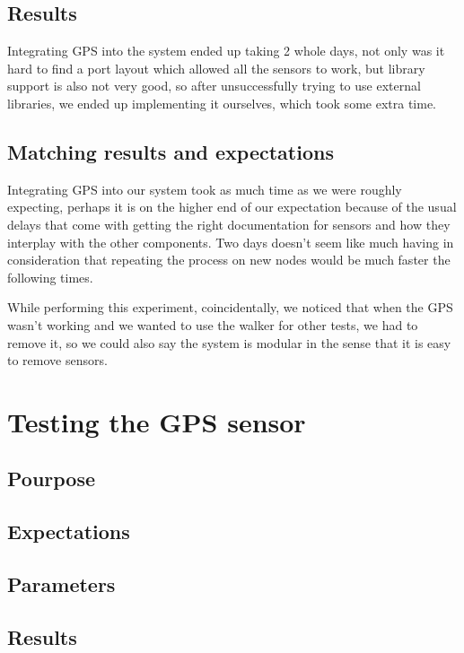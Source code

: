 	\subsection{Results}
	Integrating GPS into the system ended up taking 2 whole days, not only was it hard to find a port layout which allowed all the sensors to work, but library support is also not very good, so after unsuccessfully trying to use external libraries, we ended up implementing it ourselves, which took some extra time.

	\subsection{Matching results and expectations}
	Integrating GPS into our system took as much time as we were roughly expecting, perhaps it is on the higher end of our expectation because of the usual delays that come with getting the right documentation for sensors and how they interplay with the other components. Two days doesn't seem like much having in consideration that repeating the process on new nodes would be much faster the following times.

	While performing this experiment, coincidentally, we noticed that when the GPS wasn't working and we wanted to use the walker for other tests, we had to remove it, so we could also say the system is modular in the sense that it is easy to remove sensors.

\section{Testing the GPS sensor}

	\subsection{Pourpose}

	\subsection{Expectations}

	\subsection{Parameters}

	\subsection{Results}

